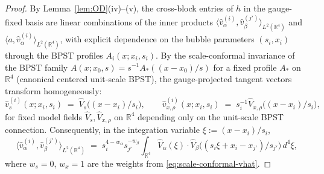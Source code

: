\documentclass[11pt,letterpaper]{article}
\theoremstyle{definition}
\newcommand{\bbR}{\mathbb{R}}
\begin{document}
\begin{proof}
By Lemma~\ref{lem:OD}(iv)--(v), the cross-block entries of $h$ in the gauge-fixed basis are linear combinations of the inner products $\langle \hat v_\alpha^{(i)}, \hat v_\beta^{(j')}\rangle_{L^2(\bbR^4)}$ and $\langle a, \hat v_\alpha^{(i)}\rangle_{L^2(\bbR^4)}$, with explicit dependence on the bubble parameters $(s_i, x_i)$ through the BPST profiles $A_i(x; x_i, s_i)$. By the scale-conformal invariance of the BPST family $A(x; x_0, s) = s^{-1}A_*((x-x_0)/s)$ for a fixed profile $A_*$ on $\bbR^4$ (canonical centered unit-scale BPST), the gauge-projected tangent vectors transform homogeneously:
\begin{equation}\label{eq:scale-conformal-vhat}
\hat v_s^{(i)}(x; x_i, s_i) \;=\; \hat V_s\bigl((x-x_i)/s_i\bigr),\qquad \hat v_{x,\rho}^{(i)}(x; x_i, s_i) \;=\; s_i^{-1}\hat V_{x,\rho}\bigl((x-x_i)/s_i\bigr),
\end{equation}
for fixed model fields $\hat V_s, \hat V_{x,\rho}$ on $\bbR^4$ depending only on the unit-scale BPST connection. Consequently, in the integration variable $\xi := (x-x_i)/s_i$,
\[
\langle \hat v_\alpha^{(i)},\hat v_\beta^{(j')}\rangle_{L^2(\bbR^4)} \;=\; s_i^{4-w_\alpha} s_{j'}^{-w_\beta}\!\!\int_{\bbR^4}\!\hat V_\alpha(\xi)\cdot \hat V_\beta\bigl((s_i\xi + x_i - x_{j'})/s_{j'}\bigr)\,d^4\xi,
\]
where $w_s = 0$, $w_x = 1$ are the weights from \eqref{eq:scale-conformal-vhat}.


\end{proof}
\end{document}
